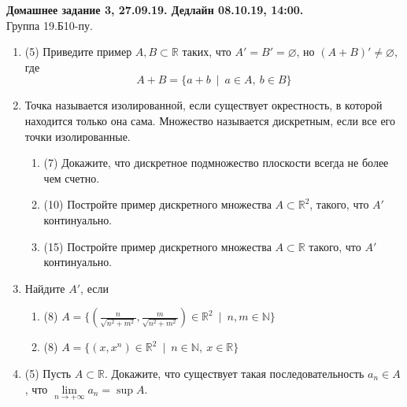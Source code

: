 \documentclass[a4paper]{article}
\begin{document}
\newcommand\HeaderDZ[5]{
\begin{center}
		\textbf{Домашнее задание #3, #2. Дедлайн #4, #5.}\\
		Группа #1.Б10-пу.\\
\end{center}
\vspace{-\baselineskip}
\bigskip
\bigskip
}



\renewcommand{\labelenumii}{\arabic{enumii})}
\renewcommand{\labelenumiii}{\roman{enumiii})}

\HeaderDZ{19}{27.09.19}{3}{08.10.19}{14:00}

\begin{enumerate}
    \item (5) Приведите пример $A, B\subset \mathbb R$ таких, что $A' = B' = \varnothing$, но $(A + B)'\neq \varnothing$, где
    \[
        A+B = \{a+b\ \mid\ a\in A,\ b\in B\}
    \]
    
    \item Точка называется изолированной, если существует окрестность, в которой находится только она сама. Множество называется дискретным, если все его точки изолированные. 
	\begin{enumerate}
		\item (7) Докажите, что дискретное подмножество плоскости всегда не более чем счетно.
		\item (10) Постройте пример дискретного множества $A\subset \mathbb R^2$, такого, что $A'$ континуально.
		\item (15) Постройте пример дискретного множества $A\subset\mathbb R$ такого, что $A'$ континуально.
	\end{enumerate}
	
	\item Найдите $A'$, если
    \begin{enumerate}
        \item (8) $A = \{\left(\frac{n}{\sqrt{n^2+m^2}},\frac{m}{\sqrt{n^2+m^2}}\right)\in \mathbb R^2\ \mid\ n,m\in \mathbb N\}$
        \item (8) $A = \{(x,x^n)\in \mathbb R^2\ \mid\ n\in \mathbb N,\ x\in \mathbb R\}$
    \end{enumerate}
	
	\item (5) Пусть $A\subset\mathbb R$. Докажите, что существует такая последовательность $a_n\in A$, что $\lim\limits_{n\to +\infty} a_n = \sup A$.
	

\end{enumerate}
\end{document}
